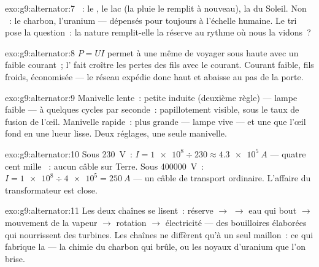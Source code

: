 \begin{solution}{exo:g9:alternator:7}
~: le , le lac (la pluie le remplit à nouveau), la
 du Soleil. Non ~: le charbon, l'uranium ---
dépensés pour toujours à l'échelle humaine. Le tri pose la question~:
la nature remplit-elle la réserve au rythme où nous la vidons~?
\end{solution}

\begin{solution}{exo:g9:alternator:8}
$P = U I$ permet à une même  de voyager sous haute 
avec un faible courant~; l' fait croître les pertes des
fils avec le courant. Courant faible, fils froids, 
économisée --- le réseau expédie donc haut et abaisse au pas de la
porte.
\end{solution}

\begin{solution}{exo:g9:alternator:9}
Manivelle lente~: petite  induite (deuxième règle) --- lampe
faible --- à quelques cycles par seconde~: papillotement visible, sous
le taux de fusion de l'œil. Manivelle rapide~:  plus grande ---
lampe vive --- et une  que l'œil fond en une lueur lisse.
Deux réglages, une seule manivelle.
\end{solution}

\begin{solution}{exo:g9:alternator:10}
Sous \qty{230}{V}~: $I = \num{1e8} \div 230 \approx \qty{4.3e5}{A}$
--- quatre cent mille ~: aucun câble sur Terre. Sous
\qty{400000}{V}~: $I = \num{1e8} \div \num{4e5} = \qty{250}{A}$ ---
un câble de transport ordinaire. L'affaire du transformateur est
close.
\end{solution}

\begin{solution}{exo:g9:alternator:11}
Les deux chaînes se lisent~: réserve $\to$  $\to$ eau qui bout
$\to$ mouvement de la vapeur $\to$ rotation $\to$ électricité --- des
bouilloires élaborées qui nourrissent des turbines. Les chaînes ne
diffèrent qu'à un seul maillon~: ce qui fabrique la  --- la
chimie du charbon qui brûle, ou les noyaux d'uranium que l'on brise.
\end{solution}

